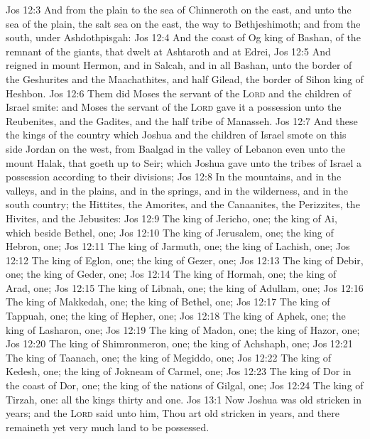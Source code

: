 \vs Jos 12:3 And from the plain to the sea of Chinneroth on the east, and unto the sea of the plain,  the salt sea on the east, the way to Bethjeshimoth; and from the south, under Ashdothpisgah:
\vs Jos 12:4 And the coast of Og king of Bashan,  of the remnant of the giants, that dwelt at Ashtaroth and at Edrei,
\vs Jos 12:5 And reigned in mount Hermon, and in Salcah, and in all Bashan, unto the border of the Geshurites and the Maachathites, and half Gilead, the border of Sihon king of Heshbon.
\vs Jos 12:6 Them did Moses the servant of the \textsc{Lord} and the children of Israel smite: and Moses the servant of the \textsc{Lord} gave it  a possession unto the Reubenites, and the Gadites, and the half tribe of Manasseh.
\vs Jos 12:7 And these  the kings of the country which Joshua and the children of Israel smote on this side Jordan on the west, from Baalgad in the valley of Lebanon even unto the mount Halak, that goeth up to Seir; which Joshua gave unto the tribes of Israel  a possession according to their divisions;
\vs Jos 12:8 In the mountains, and in the valleys, and in the plains, and in the springs, and in the wilderness, and in the south country; the Hittites, the Amorites, and the Canaanites, the Perizzites, the Hivites, and the Jebusites:
\vs Jos 12:9 The king of Jericho, one; the king of Ai, which  beside Bethel, one;
\vs Jos 12:10 The king of Jerusalem, one; the king of Hebron, one;
\vs Jos 12:11 The king of Jarmuth, one; the king of Lachish, one;
\vs Jos 12:12 The king of Eglon, one; the king of Gezer, one;
\vs Jos 12:13 The king of Debir, one; the king of Geder, one;
\vs Jos 12:14 The king of Hormah, one; the king of Arad, one;
\vs Jos 12:15 The king of Libnah, one; the king of Adullam, one;
\vs Jos 12:16 The king of Makkedah, one; the king of Bethel, one;
\vs Jos 12:17 The king of Tappuah, one; the king of Hepher, one;
\vs Jos 12:18 The king of Aphek, one; the king of Lasharon, one;
\vs Jos 12:19 The king of Madon, one; the king of Hazor, one;
\vs Jos 12:20 The king of Shimronmeron, one; the king of Achshaph, one;
\vs Jos 12:21 The king of Taanach, one; the king of Megiddo, one;
\vs Jos 12:22 The king of Kedesh, one; the king of Jokneam of Carmel, one;
\vs Jos 12:23 The king of Dor in the coast of Dor, one; the king of the nations of Gilgal, one;
\vs Jos 12:24 The king of Tirzah, one: all the kings thirty and one.
\vs Jos 13:1 Now Joshua was old  stricken in years; and the \textsc{Lord} said unto him, Thou art old  stricken in years, and there remaineth yet very much land to be possessed.
